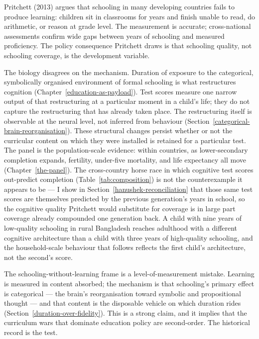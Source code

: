 \documentclass[12pt,letterpaper]{article}
\begin{document}
Pritchett (2013) argues that schooling in many developing countries fails to produce learning: children sit in classrooms for years and finish unable to read, do arithmetic, or reason at grade level. The measurement is accurate; cross-national assessments confirm wide gaps between years of schooling and measured proficiency. The policy consequence Pritchett draws is that schooling quality, not schooling coverage, is the development variable.

The biology disagrees on the mechanism. Duration of exposure to the categorical, symbolically organised environment of formal schooling is what restructures cognition (Chapter~\ref{education-as-payload}). Test scores measure one narrow output of that restructuring at a particular moment in a child's life; they do not capture the restructuring that has already taken place. The restructuring itself is observable at the neural level, not inferred from behaviour (Section~\ref{categorical-brain-reorganisation}). These structural changes persist whether or not the curricular content on which they were installed is retained for a particular test. The panel is the population-scale evidence: within countries, as lower-secondary completion expands, fertility, under-five mortality, and life expectancy all move (Chapter~\ref{the-panel}). The cross-country horse race in which cognitive test scores out-predict completion (Table~\ref{tab:composition}) is not the counterexample it appears to be --- I show in Section~\ref{hanushek-reconciliation} that those same test scores are themselves predicted by the previous generation's years in school, so the cognitive quality Pritchett would substitute for coverage is in large part coverage already compounded one generation back. A child with nine years of low-quality schooling in rural Bangladesh reaches adulthood with a different cognitive architecture than a child with three years of high-quality schooling, and the household-scale behaviour that follows reflects the first child's architecture, not the second's score.

The schooling-without-learning frame is a level-of-measurement mistake. Learning is measured in content absorbed; the mechanism is that schooling's primary effect is categorical --- the brain's reorganisation toward symbolic and propositional thought --- and that content is the disposable vehicle on which duration rides (Section~\ref{duration-over-fidelity}). This is a strong claim, and it implies that the curriculum wars that dominate education policy are second-order. The historical record is the test.
\end{document}
